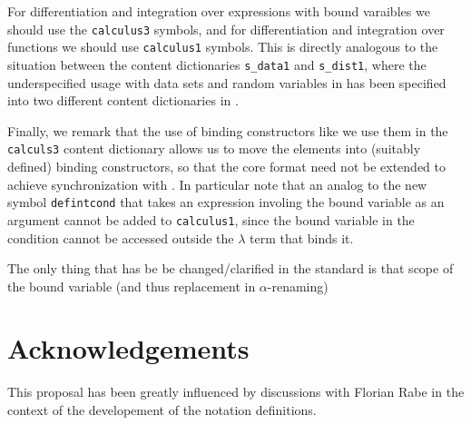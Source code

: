 \documentclass[12pt]{article}
\begin{document}
For differentiation and integration over expressions with bound varaibles we should use
the {\texttt{calculus3}} symbols, and for differentiation and integration over functions
we should use {\texttt{calculus1}} symbols. This is directly analogous to the situation
between the content dictionaries {\texttt{s_data1}} and {\texttt{s_dist1}}, where the
underspecified usage with data sets and random variables in {\mathml} has been specified
into two different content dictionaries in {\openmath}.

Finally, we remark that the use of binding constructors like we use them in the
{\texttt{calculs3}} content dictionary allows us to move the {\mathml}
{} elements into (suitably defined) binding constructors, so that the
core {\openmath} format need not be extended to achieve synchronization with {\mathml}. In
particular note that an analog to the new symbol {\texttt{defintcond}} that takes an
expression involing the bound variable as an argument cannot be added to
{\texttt{calculus1}}, since the bound variable in the condition cannot be accessed outside
the $\lambda$ term that binds it.

The only thing that has be be changed/clarified in the {} standard is that scope
of the bound variable (and thus replacement in $\alpha$-renaming) 


% 


\section{Acknowledgements}
This proposal has been greatly influenced by discussions with Florian Rabe in the context
of the developement of the {} notation definitions.

 

\end{document}
